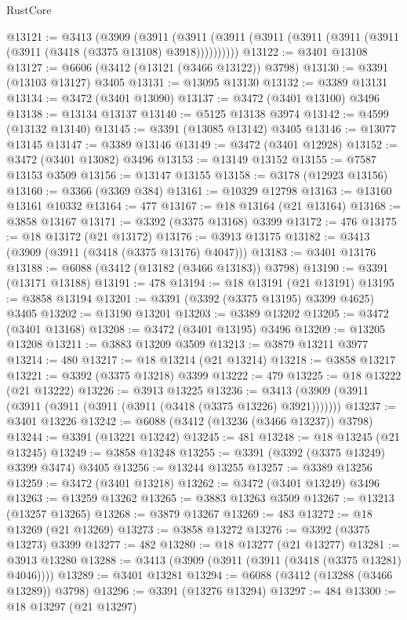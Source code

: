 \begin{lexlean}{RustCore}
\begin{coremodule}
@13121 := @3413
    (@3909
      (@3911 (@3911 (@3911 (@3911 (@3911 (@3911 (@3911 (@3911 (@3418 (@3375 @13108) @3918))))))))))
@13122 := @3401 @13108
@13127 := @6606 (@3412 (@13121 (@3466 @13122)) @3798)
@13130 := @3391 (@13103 @13127) @3405
@13131 := @13095 @13130
@13132 := @3389 @13131
@13134 := @3472 (@3401 @13090)
@13137 := @3472 (@3401 @13100) @3496
@13138 := @13134 @13137
@13140 := @5125 @13138 @3974
@13142 := @4599 (@13132 @13140)
@13145 := @3391 (@13085 @13142) @3405
@13146 := @13077 @13145
@13147 := @3389 @13146
@13149 := @3472 (@3401 @12928)
@13152 := @3472 (@3401 @13082) @3496
@13153 := @13149 @13152
@13155 := @7587 @13153 @3509
@13156 := @13147 @13155
@13158 := @3178 (@12923 @13156)
@13160 := @3366 (@3369 @384)
@13161 := @10329 @12798
@13163 := @13160 @13161 @10332
@13164 := 477
@13167 := @18 @13164 (@21 @13164)
@13168 := @3858 @13167
@13171 := @3392 (@3375 @13168) @3399
@13172 := 476
@13175 := @18 @13172 (@21 @13172)
@13176 := @3913 @13175
@13182 := @3413 (@3909 (@3911 (@3418 (@3375 @13176) @4047)))
@13183 := @3401 @13176
@13188 := @6088 (@3412 (@13182 (@3466 @13183)) @3798)
@13190 := @3391 (@13171 @13188)
@13191 := 478
@13194 := @18 @13191 (@21 @13191)
@13195 := @3858 @13194
@13201 := @3391 (@3392 (@3375 @13195) @3399 @4625) @3405
@13202 := @13190 @13201
@13203 := @3389 @13202
@13205 := @3472 (@3401 @13168)
@13208 := @3472 (@3401 @13195) @3496
@13209 := @13205 @13208
@13211 := @3883 @13209 @3509
@13213 := @3879 @13211 @3977
@13214 := 480
@13217 := @18 @13214 (@21 @13214)
@13218 := @3858 @13217
@13221 := @3392 (@3375 @13218) @3399
@13222 := 479
@13225 := @18 @13222 (@21 @13222)
@13226 := @3913 @13225
@13236 := @3413 (@3909 (@3911 (@3911 (@3911 (@3911 (@3911 (@3418 (@3375 @13226) @3921)))))))
@13237 := @3401 @13226
@13242 := @6088 (@3412 (@13236 (@3466 @13237)) @3798)
@13244 := @3391 (@13221 @13242)
@13245 := 481
@13248 := @18 @13245 (@21 @13245)
@13249 := @3858 @13248
@13255 := @3391 (@3392 (@3375 @13249) @3399 @3474) @3405
@13256 := @13244 @13255
@13257 := @3389 @13256
@13259 := @3472 (@3401 @13218)
@13262 := @3472 (@3401 @13249) @3496
@13263 := @13259 @13262
@13265 := @3883 @13263 @3509
@13267 := @13213 (@13257 @13265)
@13268 := @3879 @13267
@13269 := 483
@13272 := @18 @13269 (@21 @13269)
@13273 := @3858 @13272
@13276 := @3392 (@3375 @13273) @3399
@13277 := 482
@13280 := @18 @13277 (@21 @13277)
@13281 := @3913 @13280
@13288 := @3413 (@3909 (@3911 (@3911 (@3418 (@3375 @13281) @4046))))
@13289 := @3401 @13281
@13294 := @6088 (@3412 (@13288 (@3466 @13289)) @3798)
@13296 := @3391 (@13276 @13294)
@13297 := 484
@13300 := @18 @13297 (@21 @13297)

\end{coremodule}
\end{lexlean}
